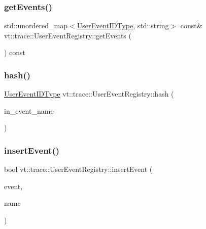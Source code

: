 \mbox{\label{structvt_1_1trace_1_1_user_event_registry_aaa8cbfc8f3596bb5f9aa97cccd72f890}} 
\subsubsection{\texorpdfstring{get\+Events()}{getEvents()}}
{\footnotesize\ttfamily std\+::unordered\+\_\+map$<$\hyperlink{namespacevt_1_1trace_a5908920d051c144c89f17c69ed262350}{User\+Event\+I\+D\+Type}, std\+::string$>$ const\& vt\+::trace\+::\+User\+Event\+Registry\+::get\+Events (\begin{DoxyParamCaption}{ }\end{DoxyParamCaption}) const\hspace{0.3cm}{\ttfamily [inline]}}

\mbox{\label{structvt_1_1trace_1_1_user_event_registry_a99ef8a7f7df7a11fac6ada816f83cfbf}} 
\subsubsection{\texorpdfstring{hash()}{hash()}}
{\footnotesize\ttfamily \hyperlink{namespacevt_1_1trace_a5908920d051c144c89f17c69ed262350}{User\+Event\+I\+D\+Type} vt\+::trace\+::\+User\+Event\+Registry\+::hash (\begin{DoxyParamCaption}\item[{std\+::string const \&}]{in\+\_\+event\+\_\+name }\end{DoxyParamCaption})}

\mbox{\label{structvt_1_1trace_1_1_user_event_registry_a5322490b81bb736a4649e23d47fd374b}} 
\subsubsection{\texorpdfstring{insert\+Event()}{insertEvent()}}
{\footnotesize\ttfamily bool vt\+::trace\+::\+User\+Event\+Registry\+::insert\+Event (\begin{DoxyParamCaption}\item[{\hyperlink{namespacevt_1_1trace_a5908920d051c144c89f17c69ed262350}{User\+Event\+I\+D\+Type}}]{event,  }\item[{std\+::string const \&}]{name }\end{DoxyParamCaption})\hspace{0.3cm}{\ttfamily [private]}}

